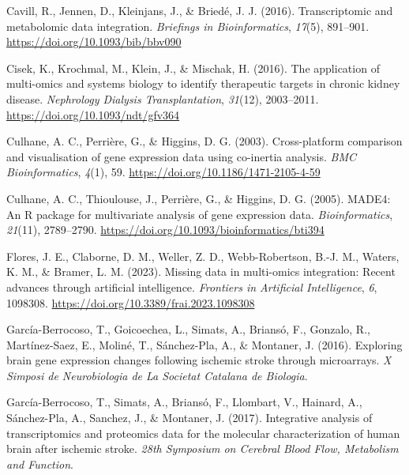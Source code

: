 \documentclass[a4paper, nobind]{templates/ociamthesis}
\newlength{\cslhangindent}
\newenvironment{CSLReferences}[2] %
 {%
  \setlength{\parindent}{0pt}
  \ifodd #1
  \let\oldpar\par
  \def\par{\hangindent=\cslhangindent\oldpar}
  \fi
  \setlength{\parskip}{1mm}
  \setlength{\baselineskip}{6mm}
 }%
 {}
\begin{document}
\begin{CSLReferences}{1}{0}
\leavevmode{}%
Cavill, R., Jennen, D., Kleinjans, J., \& Briedé, J. J. (2016). Transcriptomic and metabolomic data integration. \emph{Briefings in Bioinformatics}, \emph{17}(5), 891--901. \url{https://doi.org/10.1093/bib/bbv090}

\leavevmode{}%
Cisek, K., Krochmal, M., Klein, J., \& Mischak, H. (2016). The application of multi-omics and systems biology to identify therapeutic targets in chronic kidney disease. \emph{Nephrology Dialysis Transplantation}, \emph{31}(12), 2003--2011. \url{https://doi.org/10.1093/ndt/gfv364}

\leavevmode{}%
Culhane, A. C., Perrière, G., \& Higgins, D. G. (2003). Cross-platform comparison and visualisation of gene expression data using co-inertia analysis. \emph{BMC Bioinformatics}, \emph{4}(1), 59. \url{https://doi.org/10.1186/1471-2105-4-59}

\leavevmode{}%
Culhane, A. C., Thioulouse, J., Perrière, G., \& Higgins, D. G. (2005). {MADE4}: An {R} package for multivariate analysis of gene expression data. \emph{Bioinformatics}, \emph{21}(11), 2789--2790. \url{https://doi.org/10.1093/bioinformatics/bti394}

\leavevmode{}%
Flores, J. E., Claborne, D. M., Weller, Z. D., Webb-Robertson, B.-J. M., Waters, K. M., \& Bramer, L. M. (2023). Missing data in multi-omics integration: {Recent} advances through artificial intelligence. \emph{Frontiers in Artificial Intelligence}, \emph{6}, 1098308. \url{https://doi.org/10.3389/frai.2023.1098308}

\leavevmode{}%
García-Berrocoso, T., Goicoechea, L., Simats, A., Briansó, F., Gonzalo, R., Martínez-Saez, E., Moliné, T., Sánchez-Pla, A., \& Montaner, J. (2016). Exploring brain gene expression changes following ischemic stroke through microarrays. \emph{X Simposi de Neurobiologia de La Societat Catalana de Biologia}.

\leavevmode{}%
García-Berrocoso, T., Simats, A., Briansó, F., Llombart, V., Hainard, A., Sánchez-Pla, A., Sanchez, J., \& Montaner, J. (2017). Integrative analysis of transcriptomics and proteomics data for the molecular characterization of human brain after ischemic stroke. \emph{28th Symposium on Cerebral Blood Flow, Metabolism and Function}.


\end{CSLReferences}
\end{document}
